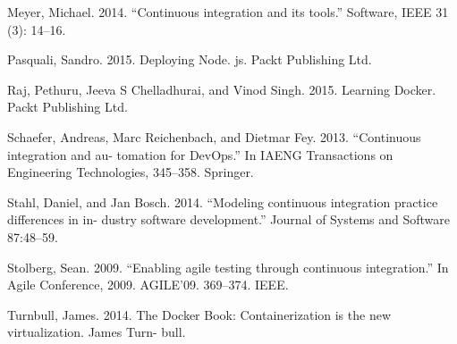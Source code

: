 Meyer, Michael. 2014. “Continuous integration and its tools.” Software, IEEE 31 (3): 14–16.

Pasquali, Sandro. 2015. Deploying Node. js. Packt Publishing Ltd.

Raj, Pethuru, Jeeva S Chelladhurai, and Vinod Singh. 2015. Learning Docker. Packt Publishing Ltd.

Schaefer, Andreas, Marc Reichenbach, and Dietmar Fey. 2013. “Continuous integration and au- tomation for DevOps.” In IAENG Transactions on Engineering Technologies, 345–358. Springer.

Stahl, Daniel, and Jan Bosch. 2014. “Modeling continuous integration practice differences in in- dustry software development.” Journal of Systems and Software 87:48–59.

Stolberg, Sean. 2009. “Enabling agile testing through continuous integration.” In Agile Conference, 2009. AGILE’09. 369–374. IEEE.

Turnbull, James. 2014. The Docker Book: Containerization is the new virtualization. James Turn- bull.

\newpage
